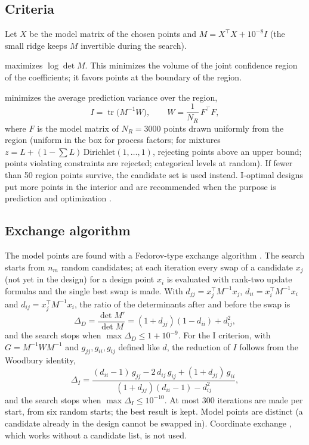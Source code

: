 \subsection{Criteria}
Let $X$ be the model matrix of the chosen points and $M = X^\top X + 10^{-8} I$ (the small ridge keeps $M$
invertible during the search).
\begin{description}[leftmargin=0pt]
\item[D-optimal (best coefficients)] maximizes $\log\det M$. This minimizes the volume of the joint confidence
region of the coefficients; it favors points at the boundary of the region.
\item[I-optimal (best prediction)] minimizes the average prediction variance over the region,
\begin{equation}
I = \operatorname{tr}\bigl(M^{-1} W\bigr), \qquad W = \frac{1}{N_R}\, F^\top F,
\label{eq:ch03-icrit}
\end{equation}
where $F$ is the model matrix of $N_R = 3000$ points drawn uniformly from the region (uniform in the box for
process factors; for mixtures $z = L + (1 - \sum L)\,\text{Dirichlet}(1, \dots, 1)$, rejecting points above an
upper bound; points violating constraints are rejected; categorical levels at random). If fewer than 50 region
points survive, the candidate set is used instead. I-optimal designs put more points in the interior and are
recommended when the purpose is prediction and optimization \citep{goos2011}.
\end{description}

\subsection{Exchange algorithm}
The model points are found with a Fedorov-type exchange algorithm \citep{cook1980}. The search starts from $n_m$
random candidates; at each iteration every swap of a candidate $x_j$ (not yet in the design) for a design point
$x_i$ is evaluated with rank-two update formulas and the single best swap is made. With
$d_{jj} = x_j^\top M^{-1} x_j$, $d_{ii} = x_i^\top M^{-1} x_i$ and $d_{ij} = x_j^\top M^{-1} x_i$, the ratio of the
determinants after and before the swap is
\begin{equation}
\Delta_D = \frac{\det M'}{\det M} = (1 + d_{jj})(1 - d_{ii}) + d_{ij}^2 ,
\label{eq:ch03-fedorov}
\end{equation}
and the search stops when $\max \Delta_D \le 1 + 10^{-9}$. For the I criterion, with $G = M^{-1} W M^{-1}$ and
$g_{jj}, g_{ii}, g_{ij}$ defined like $d$, the reduction of $I$ follows from the Woodbury identity,
\begin{equation}
\Delta_I = \frac{(d_{ii}-1)\,g_{jj} - 2\,d_{ij}\,g_{ij} + (1+d_{jj})\,g_{ii}}{(1+d_{jj})(d_{ii}-1) - d_{ij}^2},
\label{eq:ch03-iswap}
\end{equation}
and the search stops when $\max \Delta_I \le 10^{-10}$. At most 300 iterations are made per start, from six random
starts; the best result is kept. Model points are distinct (a candidate already in the design cannot be swapped in).
Coordinate exchange \citep{meyer1995}, which works without a candidate list, is not used.


